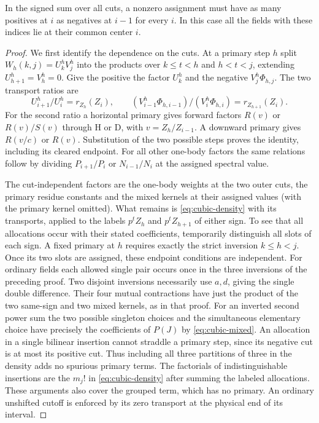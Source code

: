 \begin{lemma}\label{lem:cubic-pin}
In the signed sum over all cuts, a nonzero assignment must have as
many positives at $i$ as negatives at $i-1$ for every $i$. In this
case all the fields with these indices lie at their common center $i$.
\end{lemma}

\begin{proof}
We first identify the dependence on the cuts. At a primary step $h$
split $W_h(k,j)=U_k^h V_j^h$ into the products over $k\le t<h$ and
$h<t<j$, extending $U_{h+1}^h=V_h^h=0$. Give the positive the factor
$U_k^h$ and the negative $V_j^h\Phi_{h,j}$. The two transport ratios are
\[
 U_{i+1}^h/U_i^h=r_{Z_h}(Z_i),\qquad
 (V_{i-1}^h\Phi_{h,i-1})/(V_i^h\Phi_{h,i})=r_{Z_{h+1}}(Z_i).
\]
For the second ratio a horizontal primary gives forward factors
$R(v)$ or $R(v)/S(v)$ through H or D, with $v=Z_h/Z_{i-1}$.
A downward primary gives $R(v/c)$ or $R(v)$. Substitution of the
two possible steps proves the identity, including its cleared endpoint.
For all other one-body factors the same relations follow by dividing
$P_{i+1}/P_i$ or $N_{i-1}/N_i$ at the assigned spectral value.

The cut-independent factors are the one-body weights at the two outer
cuts, the primary residue constants and the mixed kernels at their
assigned values (with the primary kernel omitted). What remains is
\eqref{eq:cubic-density} with its transports, applied to the labels
$p^t Z_h$ and $p^t Z_{h+1}$ of either sign. To see that all allocations
occur with their stated coefficients, temporarily distinguish all
slots of each sign. A fixed primary at $h$ requires exactly the strict
inversion $k\le h<j$. Once its two slots are assigned, these endpoint
conditions are independent. For ordinary fields each allowed single
pair occurs once in the three inversions of the preceding proof. Two
disjoint inversions necessarily use $a,d$, giving the single double
difference. Their four mutual contractions have just the product of
the two same-sign and two mixed kernels, as in that proof. For an
inverted second power sum the two possible singleton choices and the
simultaneous elementary choice have precisely the coefficients of
$P(J)$ by \eqref{eq:cubic-mixed}. An allocation in a single bilinear
insertion cannot straddle a primary step, since its negative cut is
at most its positive cut. Thus including all three partitions of
three in the density adds no spurious primary terms. The factorials
of indistinguishable insertions are the $m_j!$ in
\eqref{eq:cubic-density} after summing the labeled allocations.
These arguments also cover the grouped term, which has no primary.
An ordinary unshifted cutoff is enforced by its zero transport at the
physical end of its interval.


\end{proof}

